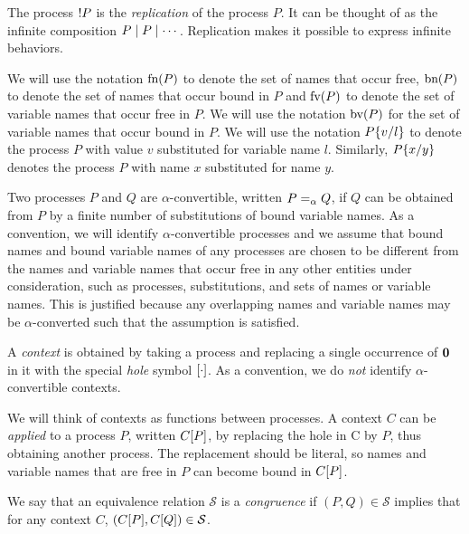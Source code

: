 The process \( {!}P \) is the \emph{replication} of the process \( P \).
It can be thought of as the infinite composition \( P \mid P \mid \cdots \).
Replication makes it possible to express infinite behaviors.

We will use the notation \( \textrm{fn}(P) \) to denote the set of
names that occur free,
\( \textrm{bn}(P) \) to denote the set of names that occur bound
in \( P \) and  \( \textrm{fv}(P) \)
to denote the set of variable names that occur free
in \( P \).  We will use the notation \( \textrm{bv}(P) \)
for the set of variable names that occur bound
in \( P \).  We will use the notation \( P\{v/l\} \) to denote
the process \( P \) with value \( v \) substituted for variable name
\( l \). Similarly, \( P\{x/y\} \) denotes the process
\( P \) with name \( x \) substituted for name \( y \).


Two processes \( P \) and \( Q \) are \( \alpha \)-convertible,
written \( P =_{\alpha} Q \), if \( Q \) can be obtained from \( P \)
by a finite number of substitutions of bound variable names.  As a
convention, we will identify \( \alpha \)-convertible processes and we
assume that bound names and bound variable names of any processes are
chosen to be different from the names and variable names that occur
free in any other entities under consideration, such as processes,
substitutions, and sets of names or variable names.  This is justified
because any overlapping names and variable names may be
\( \alpha \)-converted such that the assumption is satisfied.


A \emph{context} is obtained by taking a process and replacing a single occurrence of \( \bm{0} \) in it with the special \emph{hole} symbol \( [\cdot] \).
As a convention, we do \emph{not} identify \( \alpha \)-convertible contexts.

We will think of contexts as functions between processes.
A context \( C \) can be \emph{applied} to a process \( P \), written \( C[P] \), by replacing the hole in C by \( P \), thus obtaining another process.
The replacement should be literal, so names and variable names that are free in \( P \) can become bound in \( C[P] \).

We say that an equivalence relation \( \mathcal{S} \) is a \emph{congruence} if \( (P,Q) \in \mathcal{S} \) implies that for any context \( C \), \( (C[P], C[Q]) \in \mathcal{S} \).


